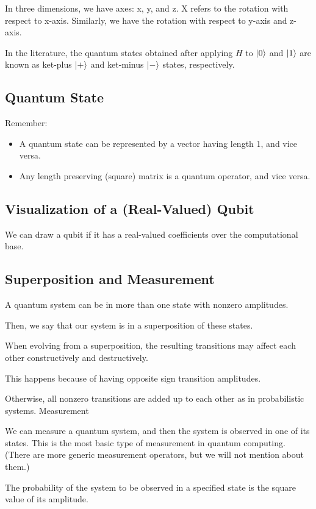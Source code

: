 In three dimensions, we have axes: x, y, and z.
X refers to the rotation with respect to x-axis.
Similarly, we have the rotation with respect to y-axis and z-axis.

In the literature, the quantum states obtained after applying $H$ to $\ket{0}$ and $\ket{1}$ are known as ket-plus $\ket{+}$ and ket-minus $\ket{-}$ states, respectively.

\subsection{Quantum State}
Remember:
\begin{itemize}
	\item A quantum state can be represented by a vector having length 1, and vice versa.
	\item Any length preserving (square) matrix is a quantum operator, and vice versa.
\end{itemize}

\subsection{Visualization of a (Real-Valued) Qubit}
We can draw a qubit if it has a real-valued coefficients over the computational base.

\subsection{Superposition and Measurement}

A quantum system can be in more than one state with nonzero amplitudes.

Then, we say that our system is in a superposition of these states.

When evolving from a superposition, the resulting transitions may affect each other constructively and destructively.

This happens because of having opposite sign transition amplitudes.

Otherwise, all nonzero transitions are added up to each other as in probabilistic systems.
Measurement

We can measure a quantum system, and then the system is observed in one of its states.
This is the most basic type of measurement in quantum computing.
(There are more generic measurement operators, but we will not mention about them.)

The probability of the system to be observed in a specified state is the square value of its amplitude.
